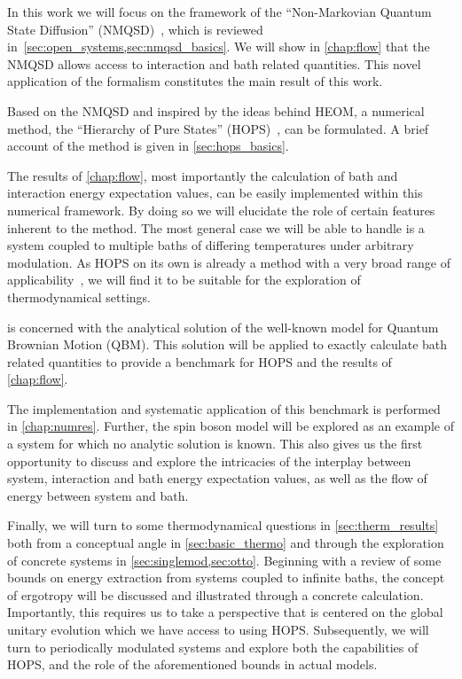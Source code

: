 
In this work we will focus on the framework of the ``Non-Markovian
Quantum State Diffusion'' (NMQSD)~\cite{Diosi1998Mar}, which is
reviewed in~\cref{sec:open_systems,sec:nmqsd_basics}. We will show in
\cref{chap:flow} that the NMQSD allows access to interaction and bath
related quantities. This novel application of the formalism
constitutes the main result of this work.

Based on the NMQSD and inspired by the ideas behind HEOM, a numerical
method, the ``Hierarchy of Pure States''
(HOPS)~\cite{RichardDiss,Hartmann2017Dec}, can be formulated. A brief
account of the method is given in \cref{sec:hops_basics}.

The results of \cref{chap:flow}, most importantly the calculation of
bath and interaction energy expectation values, can be easily
implemented within this numerical framework. By doing so we will
elucidate the role of certain features inherent to the method. The
most general case we will be able to handle is a system coupled to
multiple baths of differing temperatures under arbitrary
modulation. As HOPS on its own is already a method with a very broad
range of applicability~\cite{RichardDiss}, we will find it to be
suitable for the exploration of thermodynamical settings.

 is concerned with the analytical solution of the
well-known model for Quantum Brownian Motion (QBM). This solution will
be applied to exactly calculate bath related quantities to provide a
benchmark for HOPS and the results of \cref{chap:flow}.

The implementation and systematic application of this benchmark is
performed in \cref{chap:numres}. Further, the spin boson model will be
explored as an example of a system for which no analytic solution is
known. This also gives us the first opportunity to discuss and explore
the intricacies of the interplay between system, interaction and bath
energy expectation values, as well as the flow of energy between
system and bath.

Finally, we will turn to some thermodynamical questions in
\cref{sec:therm_results} both from a conceptual angle in
\cref{sec:basic_thermo} and through the exploration of concrete
systems in \cref{sec:singlemod,sec:otto}. Beginning with a review of
some bounds on energy extraction from systems coupled to infinite
baths, the concept of ergotropy will be discussed and illustrated
through a concrete calculation. Importantly, this requires us to take
a perspective that is centered on the global unitary evolution which
we have access to using HOPS. Subsequently, we will turn to
periodically modulated systems and explore both the capabilities of
HOPS, and the role of the aforementioned bounds in actual models.

